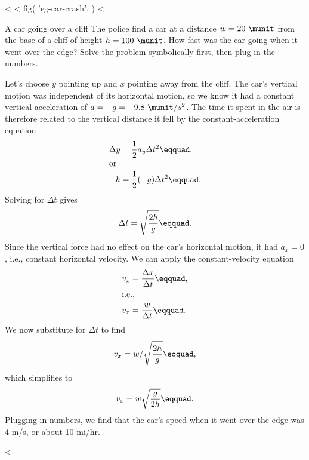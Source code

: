 <%
<%
  fig(
    'eg-car-crash',
  )
<%
\begin{eg}{A car going over a cliff}\label{eg:car-crash}
\egquestion The police find a car at a distance $w=20\ \munit$ from
the base of a cliff of height $h=100\ \munit$. How fast was the car
going when it went over the edge? Solve the problem
symbolically first, then plug in the numbers.

\eganswer Let's choose $y$ pointing up and $x$ pointing away
from the cliff. The car's vertical motion was independent of
its horizontal motion, so we know it had a constant vertical
acceleration of $a=-g=-9.8\ \munit/s^2$. The time it spent in
the air is therefore related to the vertical distance it
fell by the constant-acceleration equation
\begin{align*}
  \Delta y &= \frac{1}{2}a_y \Delta t^2\eqquad, \\
\intertext{or}
  -h &= \frac{1}{2}(-g)\Delta t^2\eqquad.
\end{align*}
Solving for $\Delta t$ gives
\begin{equation*}
  \Delta t = \sqrt{\frac{2h}{g}}\eqquad.
\end{equation*}
Since the vertical force had no effect on the car's
horizontal motion, it had $a_x=0$, i.e., constant horizontal
velocity. We can apply the constant-velocity equation
\begin{align*}
       v_x &= \frac{\Delta x}{\Delta t}\eqquad, \\
\intertext{i.e.,}
       v_x &= \frac{w}{\Delta t}\eqquad.
\end{align*}
We now substitute for $\Delta t$ to find
\begin{equation*}
      v_x = w / \sqrt{\frac{2h}{g}}\eqquad,
\end{equation*}
which simplifies to
\begin{equation*}
      v_x = w \sqrt{\frac{g}{2h}}\eqquad.
\end{equation*}
Plugging in numbers, we find that the car's speed when it
went over the edge was 4 m/s, or about 10 mi/hr.
\end{eg}

<%

